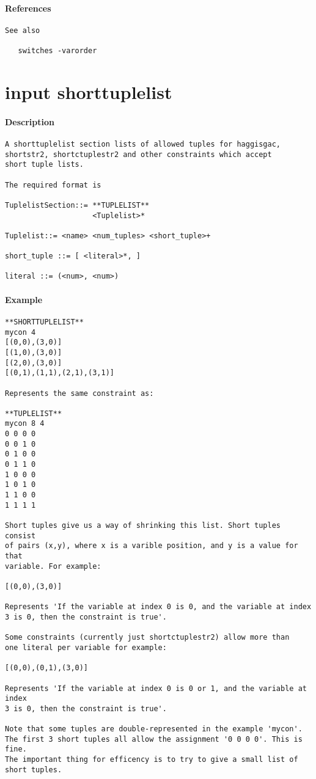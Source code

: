 \paragraph{References}
{\footnotesize
\begin{verbatim}
See also

   switches -varorder
\end{verbatim}
}
\section{input shorttuplelist}
\paragraph{Description}
{\footnotesize
\begin{verbatim}
A shorttuplelist section lists of allowed tuples for haggisgac,
shortstr2, shortctuplestr2 and other constraints which accept
short tuple lists.

The required format is

TuplelistSection::= **TUPLELIST**
                    <Tuplelist>*

Tuplelist::= <name> <num_tuples> <short_tuple>+

short_tuple ::= [ <literal>*, ]

literal ::= (<num>, <num>)
\end{verbatim}
}
\paragraph{Example}
{\footnotesize
\begin{verbatim}
**SHORTTUPLELIST**
mycon 4
[(0,0),(3,0)]
[(1,0),(3,0)]
[(2,0),(3,0)]
[(0,1),(1,1),(2,1),(3,1)]

Represents the same constraint as:

**TUPLELIST**
mycon 8 4
0 0 0 0
0 0 1 0
0 1 0 0
0 1 1 0
1 0 0 0
1 0 1 0
1 1 0 0
1 1 1 1

Short tuples give us a way of shrinking this list. Short tuples consist
of pairs (x,y), where x is a varible position, and y is a value for that
variable. For example:

[(0,0),(3,0)]

Represents 'If the variable at index 0 is 0, and the variable at index
3 is 0, then the constraint is true'.

Some constraints (currently just shortctuplestr2) allow more than
one literal per variable for example:

[(0,0),(0,1),(3,0)]

Represents 'If the variable at index 0 is 0 or 1, and the variable at index
3 is 0, then the constraint is true'.

Note that some tuples are double-represented in the example 'mycon'.
The first 3 short tuples all allow the assignment '0 0 0 0'. This is fine.
The important thing for efficency is to try to give a small list of
short tuples.
\end{verbatim}
}

